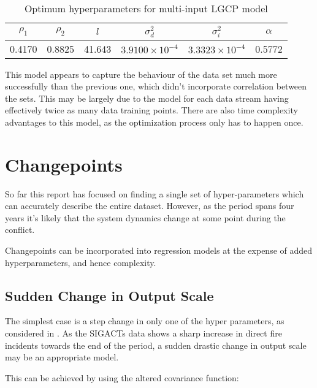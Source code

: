 \documentclass[a4paper,11pt]{report}
\begin{document}
\begin{table}[]
\centering
\caption{Optimum hyperparameters for multi-input LGCP model}
\label{LGCPChyper}
\begin{tabular}{|c|c|c|c|c|c|}
\hline
\multicolumn{1}{|c|}{\(\rho_1\)} & \multicolumn{1}{c|}{\(\rho_2\)} & \(l\)                      & \(\sigma_d^2\)            & \(\sigma_i^2\)            & \(\alpha\) \\ \hline
0.4170                            & 0.8825                           & \multicolumn{1}{c|}{41.643} & \(3.9100 \times 10^{-4}\) & \(3.3323 \times 10^{-4}\) & 0.5772     \\ \hline
\end{tabular}
\end{table}

This model appears to capture the behaviour of the data set much more successfully than the previous one, which didn't incorporate correlation between the sets. This may be largely due to the model for each data stream having effectively twice as many data training points. There are also time complexity advantages to this model, as the optimization process only has to happen once.


\chapter{Changepoints}

So far this report has focused on finding a single set of hyper-parameters which can accurately describe the entire dataset. However, as the period spans four years it's likely that the system dynamics change at some point during the conflict.

Changepoints can be incorporated into regression models at the expense of added hyperparameters, and hence complexity.

\section{Sudden Change in Output Scale}

The simplest case is a step change in only one of the hyper parameters, as considered in \cite{changepoint-prediction}. As the SIGACTs data shows a sharp increase in direct fire incidents towards the end of the period, a sudden drastic change in output scale may be an appropriate model.

This can be achieved by using the altered covariance function:
\end{document}
